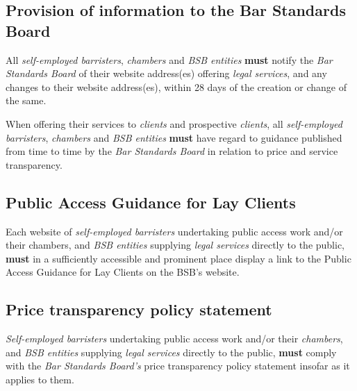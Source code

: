 \subsection{Provision of information to the Bar Standards Board}


All \emph{self-employed barristers}, \emph{chambers} and \emph{BSB
entities} \textcolor{myred}{\textbf{must}} notify the \emph{Bar Standards Board} of their website
address(es) offering \emph{legal services}, and any changes to their
website address(es), within 28 days of the creation or change of the
same.



When offering their services to \emph{clients} and prospective
\emph{clients}, all \emph{self-employed barristers}, \emph{chambers} and
\emph{BSB entities} \textcolor{myred}{\textbf{must}} have regard to guidance published from time to
time by the \emph{Bar Standards Board} in relation to price and service
transparency.



\subsection{Public Access Guidance for Lay Clients}


Each website of \emph{self-employed barristers} undertaking public
access work and/or their chambers, and \emph{BSB entities} supplying
\emph{legal services} directly to the public, \textcolor{myred}{\textbf{must}} in a sufficiently
accessible and prominent place display a link to the Public Access
Guidance for Lay Clients on the BSB's website.

\subsection{Price transparency policy statement}


\emph{Self-employed barristers} undertaking public access work and/or
their \emph{chambers}, and \emph{BSB entities} supplying \emph{legal
services} directly to the public, \textcolor{myred}{\textbf{must}} comply with the \emph{Bar
Standards Board's} price transparency policy statement insofar as it
applies to them.

